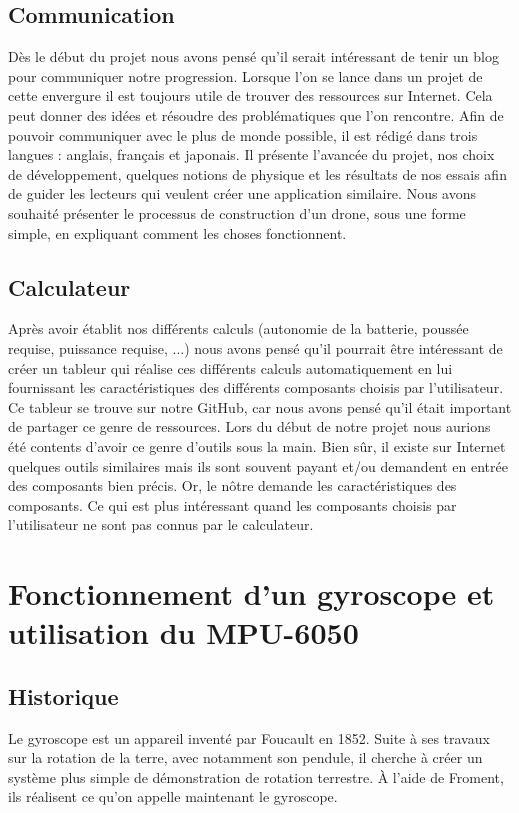 \documentclass[a4paper,10pt]{report}
\begin{document}
      \section{Communication}
	Dès le début du projet nous avons pensé qu'il serait intéressant de 
tenir un blog pour communiquer notre progression. Lorsque l'on se lance dans un 
projet de cette envergure il est toujours utile de trouver des ressources sur 
Internet. Cela peut donner des idées et résoudre des problématiques que l'on 
rencontre. Afin de pouvoir communiquer avec le plus de monde possible, il est 
rédigé dans trois langues : anglais, français et japonais. Il présente 
l'avancée du projet, nos choix de développement, quelques notions de physique 
et les résultats de nos essais afin de guider les lecteurs qui veulent créer 
une application similaire. Nous avons souhaité présenter le processus de 
construction d'un drone, sous une forme simple, en expliquant comment les 
choses fonctionnent.

      \section{Calculateur}
	\label{sec:calculateur}
	Après avoir établit nos différents calculs (autonomie de la batterie, 
poussée requise, puissance requise, ...) nous avons pensé qu'il pourrait être 
intéressant de créer un tableur qui réalise ces différents calculs 
automatiquement en lui fournissant les caractéristiques des différents 
composants choisis par l'utilisateur. Ce tableur se trouve sur notre GitHub, 
car nous avons pensé qu'il était important de partager ce genre de ressources. 
Lors du début de notre projet nous aurions été contents d'avoir ce genre 
d'outils sous la main. Bien sûr, il existe sur Internet quelques outils 
similaires\cite{dronecalc} mais ils sont souvent payant et/ou demandent en 
entrée des composants bien précis. Or, le nôtre demande les caractéristiques 
des composants. Ce qui est plus intéressant quand les composants choisis par 
l'utilisateur ne sont pas connus par le calculateur.
	
    \chapter{Fonctionnement d'un gyroscope et utilisation du MPU-6050}
      \section{Historique}
	Le gyroscope est un appareil inventé par Foucault en 1852. Suite à ses 
travaux sur la rotation de la terre, avec notamment son pendule, il cherche à 
créer un système plus simple de démonstration de rotation terrestre. À l'aide 
de Froment, ils réalisent ce qu'on appelle maintenant le gyroscope.
\end{document}
